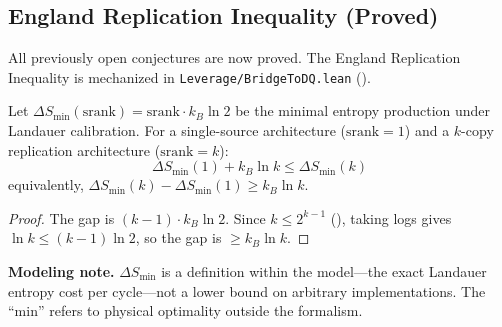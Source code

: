 \subsection{England Replication Inequality (Proved)}

All previously open conjectures are now proved. The England Replication Inequality is mechanized in \nolinkurl{Leverage/BridgeToDQ.lean} ().

\begin{theorem}\label{thm:england}
Let $\Delta S_{\min}(\text{srank}) = \text{srank} \cdot k_B \ln 2$ be the minimal entropy production under Landauer calibration. For a single-source architecture ($\text{srank} = 1$) and a $k$-copy replication architecture ($\text{srank} = k$):
\[
\Delta S_{\min}(1) + k_B \ln k \leq \Delta S_{\min}(k)
\]
equivalently, $\Delta S_{\min}(k) - \Delta S_{\min}(1) \geq k_B \ln k$.
\end{theorem}


\begin{proof}
The gap is $(k-1) \cdot k_B \ln 2$. Since $k \leq 2^{k-1}$ (), taking logs gives $\ln k \leq (k-1) \ln 2$, so the gap is $\geq k_B \ln k$.
\end{proof}

\textbf{Modeling note.} $\Delta S_{\min}$ is a definition within the model---the exact Landauer entropy cost per cycle---not a lower bound on arbitrary implementations. The ``min'' refers to physical optimality outside the formalism.
